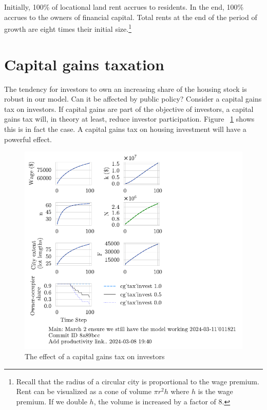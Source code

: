






Initially, 100\% of locational land rent accrues to residents. In the end, 100\% accrues to the owners of financial capital. Total rents at the end of the period of growth are eight times their initial size.\footnote{Recall that the radius of a circular city is proportional to the wage premium. Rent can be visualized as a cone of volume $\pi r^2 h$ where $h$ is the wage premium. If we double $h$, the volume is increased by a factor of 8.}

\section{Capital gains taxation}
The tendency for investors to own an increasing share of the housing stock is robust in our model. Can it be affected by public policy? Consider a capital gains tax on investors. If capital gains are part of the objective of investors, a capital gains tax will, in theory at least, reduce investor participation. Figure ~\ref{fig:CGinvest_ownership_trajectory} shows this is in fact the case. A capital gains tax on housing investment will have a powerful effect.
\begin{figure}
    \centering
    \includegraphics[scale=.8, trim={0 1.4cm 0 0},clip]{fig/cg_tax_invest-Main-_011821.pdf}
    \caption{The effect of a capital gains tax on investors}
    \label{fig:CGinvest_ownership_trajectory}
\end{figure}

